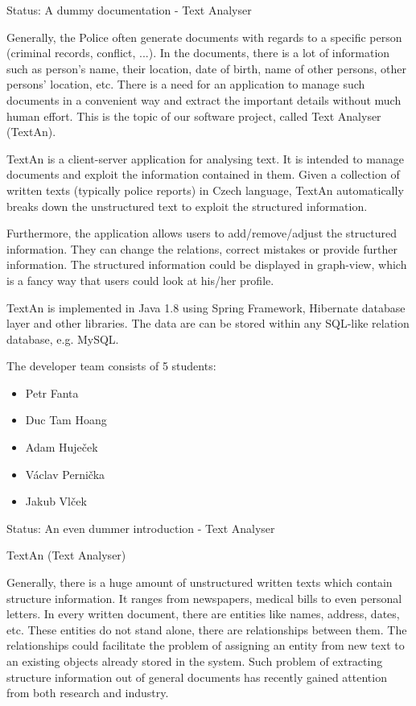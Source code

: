 Status: A dummy documentation - Text Analyser


Generally, the Police often generate documents with regards to a specific person (criminal records, conflict, ...). 
In the documents, there is a lot of information such as
person's name, their location, date of birth, name of other persons, other persons' location, etc.
There is a need for an application to manage such documents in a convenient way and extract the important details without much human effort.
This is the topic of our software project, called Text Analyser (TextAn).

TextAn is a client-server application for analysing text.
It is intended to manage documents and exploit the information contained in them.
Given a collection of written texts (typically police reports) in Czech language,
TextAn automatically breaks down the unstructured text to exploit the structured information. 

Furthermore, the application allows users to add/remove/adjust the structured information.
They can change the relations, correct mistakes or provide further information.
The structured information could be displayed in graph-view,
which is a fancy way that users could look at his/her profile. 

TextAn is implemented in Java 1.8 using Spring Framework, Hibernate database layer and other libraries.
The data are can be stored within any SQL-like relation database, e.g. MySQL.

The developer team consists of 5 students:

\begin{itemize}
\itemsep0em
\item Petr Fanta
\item Duc Tam Hoang
\item Adam Huječek
\item Václav Pernička
\item Jakub Vlček
\end{itemize}

Status: An even dummer introduction - Text Analyser

TextAn (Text Analyser)

Generally, there is a huge amount of unstructured written texts which contain structure information.
It ranges from newspapers, medical bills to even personal letters.
In every written document, there are entities like names, address, dates, etc.
These entities do not stand alone, there are relationships between them.
The relationships could facilitate the problem of assigning an entity from new text to an existing objects already stored in the system.
Such problem of extracting structure information out of general documents has recently gained attention from both research and industry.

